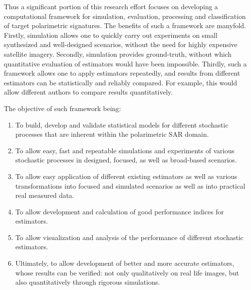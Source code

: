 Thus a significant portion of this research effort focuses on developing a computational framework for simulation, evaluation, processing and classification of target polarimetric signatures.
The benefits of such a framework are manyfold.
Firstly, simulation allows one to quickly carry out experiments on small synthesized and well-designed scenarios, without the need for highly expensive satellite imagery.
Secondly, simulation provides ground-truth, without which quantitative evaluation of estimators would have been impossible.
Thirdly, such a framework allows one to apply estimators repeatedly, and results from different estimators can be statistically and reliably compared. For example, this would allow different authors to compare results quantitatively.

The objective of such framework being:
\begin{enumerate}
\item To build, develop and validate statistical models for different stochastic processes that are inherent within the polarimetric SAR domain.
\item To allow easy, fast and repeatable simulations and experiments of various stochastic processes in designed, focused, as well as broad-based scenarios.
\item To allow easy application of different existing estimators as well as various transformations into focused and simulated scenarios as well as into practical real measured data.
\item To allow development and calculation of good performance indices for estimators. 
\item To allow visualization and analysis of the performance of different stochastic estimators.
\item Ultimately, to allow development of better and more accurate estimators, whose results can be verified: not only qualitatively on real life images, but also quantitatively through rigorous simulations.
\end{enumerate}

